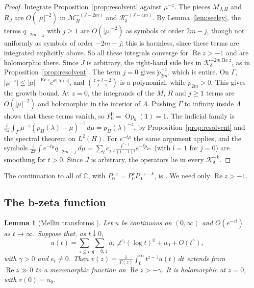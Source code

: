 \documentclass[11pt,oneside,reqno]{article}
\newcommand{\C}{\mathbb C}
\theoremstyle{plain}
\newtheorem{lemma}[theorem]{Lemma}
\theoremstyle{definition}
\theoremstyle{remark}
\begin{document}
\begin{proof}
Integrate Proposition~\ref{prop:resolvent} against \(\mu^{-z}\). The
pieces \(M_{J,H}\) and \(R_J\) are \(O(|\mu|^{-2})\) in
\(\mathcal M^{-(J-2m)}_H\) and \(\mathcal R^{-(J-4m)}_\delta\). By
Lemma~\ref{lem:seeley}, the terms \(q_{-2m-j}\) with \(j\geq1\) are
\(O(|\mu|^{-2})\) as symbols of order \(2m-j\), though not uniformly as
symbols of order \(-2m-j\); this is harmless, since these terms are
integrated explicitly above. So all these integrals converge for
\(\operatorname{Re}z>-1\) and are holomorphic there. Since \(J\) is
arbitrary, the right-hand side lies in
\(\mathcal K^{-2m\operatorname{Re}z}_\delta\), as in
Proposition~\ref{prop:resolvent}. The term \(j=0\) gives \(\tilde p_{2m}^{-z}\),
which is entire. On \(\Gamma\),
\(|\mu^{-z}|\leq|\mu|^{-\operatorname{Re}z}e^{\theta|\operatorname{Im}z|}\),
and \(\binom{z+l-2}{l-1}\) is a polynomial, while \(\tilde p_{2m}>0\). This gives
the growth bound. At \(z=0\), the integrands of the \(M\), \(R\) and
\(j\geq1\) terms are \(O(|\mu|^{-2})\) and holomorphic in the interior of
\(\Lambda\). Pushing \(\Gamma\) to infinity inside \(\Lambda\) shows that
these terms vanish, so \(P_0^0=\operatorname{Op}_b(1)=1\). The indicial
family is
\(\frac{i}{2\pi}\int_\Gamma\mu^{-z}(p_H(\lambda)-\mu)^{-1}\,d\mu=
p_H(\lambda)^{-z}\), by Proposition~\ref{prop:resolvent} and the spectral
theorem on \(L^2(H)\). For \(e^{-t\mu}\) the same argument applies, and the
symbols \(\frac{i}{2\pi}\int e^{-t\mu}q_{-2m-j}\,d\mu=\sum_lc_{j,l}
\frac{t^{l-1}}{(l-1)!}e^{-t\tilde p_{2m}}\) (with \(l=1\) for \(j=0\)) are
smoothing for \(t>0\). Since \(J\) is arbitrary, the operators lie in every
\(\mathcal K^{-k}_\delta\).
\end{proof}

The continuation to all of \(\C\), with \(P_0^{-z}=P_0^kP_0^{-z-k}\), is
\cite[Cor.~5.7]{LoyaThesis}. We need only \(\operatorname{Re}z>-1\).

\subsection{The b-zeta function}\label{subsec:bzeta}

\begin{lemma}[Mellin transforms {\cite[Lemma~5.10]{LoyaThesis}}]\label{lem:mellin}
Let \(u\) be continuous on \((0,\infty)\) and \(O(e^{-ct})\) as
\(t\to\infty\). Suppose that, as \(t\downarrow0\),
\[
 u(t)=\sum_{i\leq I}\sum_{q=0,1}u_{i,q}t^{e_i}(\log t)^q+u_{0}+O(t^{\gamma}),
\]
with \(\gamma>0\) and \(e_i\neq0\). Then
\(v(z)=\frac1{\Gamma(z)}\int_0^\infty t^{z-1}u(t)\,dt\) extends from
\(\operatorname{Re}z\gg0\) to a meromorphic function on
\(\operatorname{Re}z>-\gamma\). It is holomorphic at \(z=0\), with
\(v(0)=u_0\).
\end{lemma}
\end{document}
